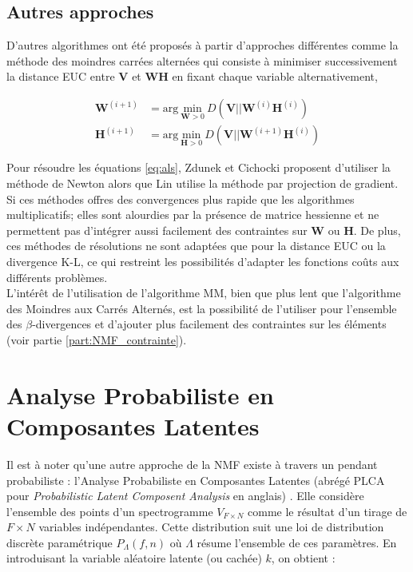 \subsection{Autres approches}

D'autres algorithmes ont été proposés à partir d'approches différentes comme la méthode des moindres carrées alternées \cite{cichocki_regularized_2007, berry_algorithms_2007} qui consiste à minimiser successivement la distance EUC entre $\mathbf{V}$ et $\mathbf{WH}$ en fixant chaque variable alternativement,

\begin{subequations}\label{eq:als}
\begin{align}
\mathbf{W}^{(i+1)} &= \text{arg}~\underset{\mathbf{W} > 0}{\text{min}}~D\left(\mathbf{V} \vert\vert\mathbf{W}^{(i)}\mathbf{H}^{(i)}\right)\\
\mathbf{H}^{(i+1)} &= \text{arg}~\underset{\mathbf{H} > 0}{\text{min}}~D\left(\mathbf{V} \vert\vert\mathbf{W}^{(i+1)}\mathbf{H}^{(i)}\right)
\end{align}
\end{subequations}

Pour résoudre les équations \ref{eq:als}, Zdunek et Cichocki \cite{zdunek2006non} proposent d'utiliser la méthode de Newton alors que Lin \cite{lin_projected_2007} utilise la méthode par projection de gradient. Si ces méthodes offres des convergences plus rapide que les algorithmes multiplicatifs; elles sont alourdies par la présence de matrice hessienne et ne permettent pas d'intégrer aussi facilement des contraintes sur $\mathbf{W}$ ou $\mathbf{H}$. De plus, ces méthodes de résolutions ne sont adaptées que pour la distance EUC ou la divergence K-L, ce qui restreint les possibilités d'adapter les fonctions coûts aux différents problèmes.\\

L'intérêt de l'utilisation de l'algorithme MM, bien que plus lent que l'algorithme des Moindres aux Carrés Alternés, est la possibilité de l'utiliser pour l'ensemble des $\beta$-divergences et d'ajouter plus facilement des contraintes sur les éléments (voir partie \ref{part:NMF_contrainte}).


\section{Analyse Probabiliste en Composantes Latentes}

Il est à noter qu'une autre approche de la NMF existe à travers un pendant probabiliste : l'Analyse Probabiliste en Composantes Latentes (abrégé PLCA pour \textit{Probabilistic Latent Composent Analysis} en anglais) \cite{hofmann_unsupervised_2001, cazau_understanding_2017}. Elle considère l'ensemble des points d'un spectrogramme $V_{F \times N}$ comme le résultat d'un tirage de $F \times N$ variables indépendantes.  Cette distribution suit une loi de distribution discrète paramétrique $P_{\Lambda}\left(f,n\right)$ où $\Lambda$ résume l'ensemble de ces paramètres. En introduisant la variable aléatoire latente (ou cachée) $k$, on obtient :

